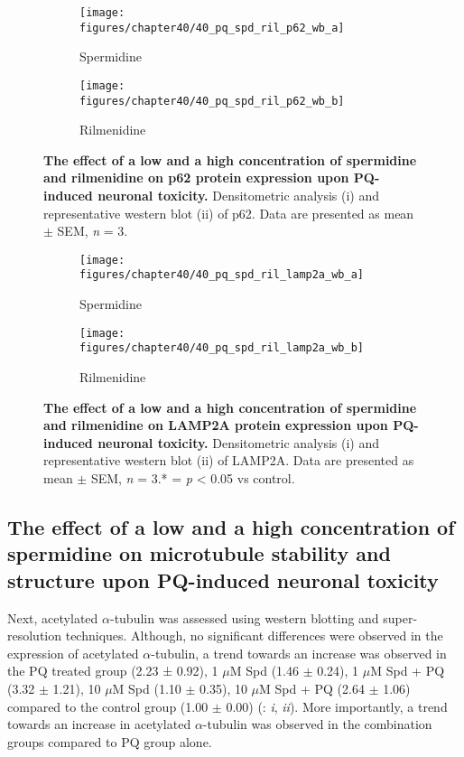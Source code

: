 \begin{figure}[!htbp]
  \center
  \begin{subfigure}[b]{0.495\linewidth}
    \texttt{[image: figures/chapter40/40\_pq\_spd\_ril\_p62\_wb\_a]}
    \caption{Spermidine}
  \end{subfigure}
  \begin{subfigure}[b]{0.495\linewidth}
    \texttt{[image: figures/chapter40/40\_pq\_spd\_ril\_p62\_wb\_b]}
    \caption{Rilmenidine}
  \end{subfigure}
  \caption[The effect of a low and a high concentration of spermidine and rilmenidine on p62 protein expression upon PQ-induced neuronal toxicity]{\textbf{The effect of a low and a high concentration of spermidine and rilmenidine on p62 protein expression upon PQ-induced neuronal toxicity.} Densitometric analysis (i) and representative western blot  (ii) of p62. Data are presented as mean $\pm$ SEM, \textit{n} = 3.}
  \label{fig:40_pq_spd_ril_p62_wb_a}
\end{figure}
  
\begin{figure}[!htbp]
  \center
  \begin{subfigure}[b]{0.495\linewidth}
    \texttt{[image: figures/chapter40/40\_pq\_spd\_ril\_lamp2a\_wb\_a]}
    \caption{Spermidine}
  \end{subfigure}
  \begin{subfigure}[b]{0.495\linewidth}
    \texttt{[image: figures/chapter40/40\_pq\_spd\_ril\_lamp2a\_wb\_b]}
    \caption{Rilmenidine}
  \end{subfigure}
  \caption[ The effect of a low and a high concentration of spermidine and rilmenidine on LAMP2A protein expression upon PQ-induced neuronal toxicity]{\textbf{The effect of a low and a high concentration of spermidine and rilmenidine on LAMP2A protein expression upon PQ-induced neuronal toxicity.} Densitometric analysis (i) and representative western blot  (ii) of LAMP2A. Data are presented as mean $\pm$ SEM, \textit{n} = 3.* = \textit{p} < 0.05 vs control.}
  \label{fig:40_pq_spd_ril_lamp2a_wb_a}
\end{figure}

\subsection{The effect of a low and a high concentration of spermidine on microtubule stability and structure upon PQ-induced neuronal toxicity}
Next, acetylated $\alpha$-tubulin was assessed using western blotting and super-resolution techniques. Although, no significant differences were observed in the expression of acetylated $\alpha$-tubulin, a trend towards an increase was observed in the PQ treated group (2.23 ± 0.92), 1 $\mu$M Spd (1.46 $\pm$ 0.24), 1 $\mu$M Spd + PQ (3.32 $\pm$ 1.21), 10 $\mu$M Spd (1.10 $\pm$ 0.35), 10 $\mu$M Spd + PQ (2.64 $\pm$ 1.06) compared to the control group (1.00 $\pm$ 0.00) (: \textit{i}, \textit{ii}). More importantly, a trend towards an increase in acetylated $\alpha$-tubulin was observed in the combination groups compared to PQ group alone. 

